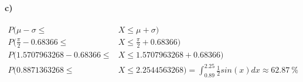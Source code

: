 \documentclass[12pt,a4paper]{report}
\begin{document}
	\paragraph{c)}
	\begin{align*}
		P(\mu -\sigma \leq &X \leq \mu + \sigma) \\
		P(\frac{\pi}{2} - 0.68366 \leq &X \leq \frac{\pi}{2} + 0.68366) \\
		P(1.5707963268 - 0.68366 \leq &X \leq 1.5707963268  + 0.68366) \\
		P(0.8871363268 \leq &X \leq 2.2544563268) = \int_{0.89}^{2.25} \frac{1}{2}sin(x) dx \approx 62.87\ \%
	\end{align*}
\end{document}
